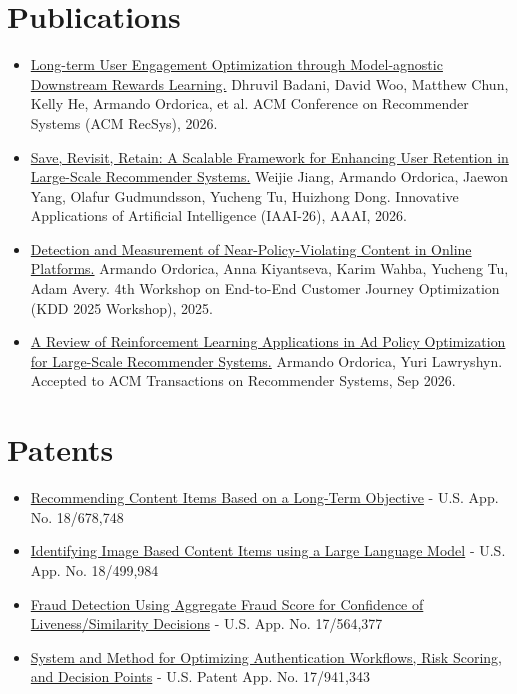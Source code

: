 \documentclass[]{deedy-resume-openfont}
\let\OldHref\href
\renewcommand{\href}[2]{\OldHref{#1}{\latobold #2}}
\begin{document}
\section{Publications}
\begin{itemize}\itemsep0em
\item \hypertarget{recsys-paper}{}\href{https://arxiv.org/abs/2607.14192}{Long-term User Engagement Optimization through Model-agnostic Downstream Rewards Learning.} Dhruvil Badani, David Woo, Matthew Chun, Kelly He, Armando Ordorica, et al. ACM Conference on Recommender Systems (ACM RecSys), 2026.
\item \hypertarget{revisit-paper}{}\href{https://ojs.aaai.org/index.php/AAAI/article/view/41434}{Save, Revisit, Retain: A Scalable Framework for Enhancing User Retention in Large-Scale Recommender Systems.} Weijie Jiang, Armando Ordorica, Jaewon Yang, Olafur Gudmundsson, Yucheng Tu, Huizhong Dong. Innovative Applications of Artificial Intelligence (IAAI-26), AAAI, 2026.
\item \hypertarget{kdd-paper}{}\href{https://cv.armandoordorica.com/papers/detection-near-policy-violating-content.pdf}{Detection and Measurement of Near-Policy-Violating Content in Online Platforms.} Armando Ordorica, Anna Kiyantseva, Karim Wahba, Yucheng Tu, Adam Avery. 4th Workshop on End-to-End Customer Journey Optimization (KDD 2025 Workshop), 2025.
\item \hypertarget{rl-review-paper}{}\href{https://cv.armandoordorica.com/papers/rl-ad-policy-optimization-review.pdf}{A Review of Reinforcement Learning Applications in Ad Policy Optimization for Large-Scale Recommender Systems.} Armando Ordorica, Yuri Lawryshyn. Accepted to ACM Transactions on Recommender Systems, Sep 2026.
\end{itemize}

\section{Patents}
\begin{itemize}\itemsep0em
\item \href{https://patents.google.com/patent/US20250139683A1/en}{Recommending Content Items Based on a Long-Term Objective} - U.S. App. No. 18/678,748
\item \href{https://patents.google.com/patent/US20250139353A1/en}{Identifying Image Based Content Items using a Large Language Model} - U.S. App. No. 18/499,984
\item \href{https://patents.google.com/patent/US20230206372A1/en}{Fraud Detection Using Aggregate Fraud Score for Confidence of Liveness/Similarity Decisions} - U.S. App. No. 17/564,377
\item \href{https://scholar.google.com/citations?view_op=view_citation&user=WGI9WWQAAAAJ&citation_for_view=WGI9WWQAAAAJ:d1gkVwhDpl0C}{System and Method for Optimizing Authentication Workflows, Risk Scoring, and Decision Points} - U.S. Patent App. No. 17/941,343
\end{itemize}
\end{document}
